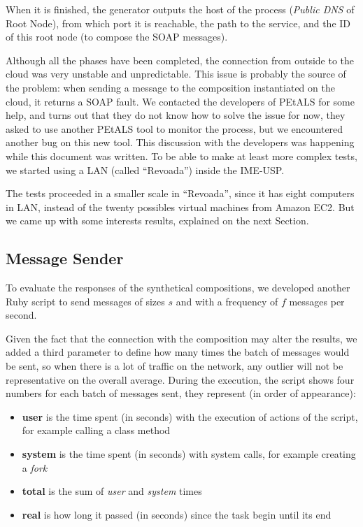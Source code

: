 When it is finished, the generator outputs the host of the process (\emph{Public DNS} of Root Node), from which port it is reachable, the path to the service, and the ID of this root node (to compose the SOAP messages).

Although all the phases have been completed, the connection from outside to the cloud was very unstable and unpredictable. This issue is probably the source of the problem: when sending a message to the composition instantiated on the cloud, it returns a SOAP fault. We contacted the developers of PEtALS for some help, and turns out that they do not know how to solve the issue for now, they asked to use another PEtALS tool to monitor the process, but we encountered another bug on this new tool. This discussion with the developers was happening while this document was written. To be able to make at least more complex tests, we started using a LAN (called ``Revoada'') inside the IME-USP.

The tests proceeded in a smaller scale in ``Revoada'', since it has eight computers in LAN, instead of the twenty possibles virtual machines from Amazon EC2. But we came up with some interests results, explained on the next Section.


\subsection{Message Sender}

To evaluate the responses of the synthetical compositions, we developed another Ruby script to send messages of sizes $s$ and with a frequency of $f$ messages per second.

Given the fact that the connection with the composition may alter the results, we added a third parameter to define how many times the batch of messages would be sent, so when there is a lot of traffic on the network, any outlier will not be representative on the overall average. During the execution, the script shows four numbers for each batch of messages sent, they represent (in order of appearance):

\begin{itemize} 
	\item \textbf{user} is the time spent (in seconds) with the execution of actions of the script, for example calling a class method
	\item \textbf{system} is the time spent (in seconds) with system calls, for example creating a \emph{fork}
	\item \textbf{total} is the sum of \emph{user} and \emph{system} times
	\item \textbf{real} is how long it passed (in seconds) since the task begin until its end
\end{itemize}

